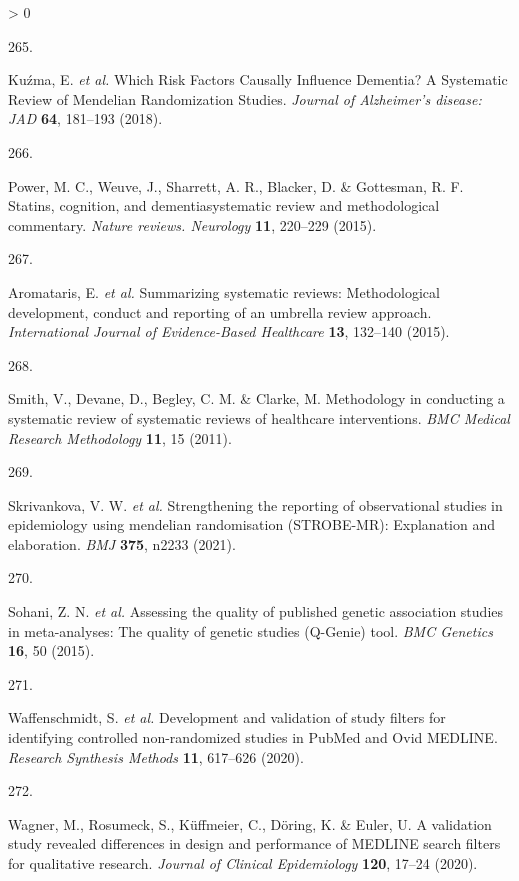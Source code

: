 \documentclass[a4paper, twoside]{templates/ociamthesis}
\newlength{\cslhangindent}
\newlength{\csllabelwidth}
\newenvironment{CSLReferences}[3] %
 {%
  \setlength{\parindent}{0pt}
  \ifodd #1 \everypar{\setlength{\hangindent}{\cslhangindent}}\ignorespaces\fi
  \ifnum #2 > 0
  \setlength{\parskip}{#2\baselineskip}
  \fi
 }%
 {}
\newcommand{\CSLLeftMargin}[1]{\parbox[t]{\maxof{\widthof{#1}}{\csllabelwidth}}{#1}}
\newcommand{\CSLRightInline}[1]{\parbox[t]{\linewidth - \csllabelwidth}{#1}}
\begin{document}
\begin{CSLReferences}{0}{0}
\leavevmode\hypertarget{ref-kuzma2018risk}{}%
\CSLLeftMargin{265. }
\CSLRightInline{Kuźma, E. \emph{et al.} Which {Risk Factors Causally Influence Dementia}? A {Systematic Review} of {Mendelian Randomization Studies}. \emph{Journal of Alzheimer's disease: JAD} \textbf{64}, 181--193 (2018).}

\leavevmode\hypertarget{ref-power2015}{}%
\CSLLeftMargin{266. }
\CSLRightInline{Power, M. C., Weuve, J., Sharrett, A. R., Blacker, D. \& Gottesman, R. F. Statins, cognition, and dementia{}systematic review and methodological commentary. \emph{Nature reviews. Neurology} \textbf{11}, 220--229 (2015).}

\leavevmode\hypertarget{ref-aromataris2015}{}%
\CSLLeftMargin{267. }
\CSLRightInline{Aromataris, E. \emph{et al.} Summarizing systematic reviews: Methodological development, conduct and reporting of an umbrella review approach. \emph{International Journal of Evidence-Based Healthcare} \textbf{13}, 132--140 (2015).}

\leavevmode\hypertarget{ref-smith2011}{}%
\CSLLeftMargin{268. }
\CSLRightInline{Smith, V., Devane, D., Begley, C. M. \& Clarke, M. Methodology in conducting a systematic review of systematic reviews of healthcare interventions. \emph{BMC Medical Research Methodology} \textbf{11}, 15 (2011).}

\leavevmode\hypertarget{ref-skrivankova2021}{}%
\CSLLeftMargin{269. }
\CSLRightInline{Skrivankova, V. W. \emph{et al.} Strengthening the reporting of observational studies in epidemiology using mendelian randomisation ({STROBE}-{MR}): Explanation and elaboration. \emph{BMJ} \textbf{375}, n2233 (2021).}

\leavevmode\hypertarget{ref-sohani2015}{}%
\CSLLeftMargin{270. }
\CSLRightInline{Sohani, Z. N. \emph{et al.} Assessing the quality of published genetic association studies in meta-analyses: The quality of genetic studies ({Q}-{Genie}) tool. \emph{BMC Genetics} \textbf{16}, 50 (2015).}

\leavevmode\hypertarget{ref-waffenschmidt2020}{}%
\CSLLeftMargin{271. }
\CSLRightInline{Waffenschmidt, S. \emph{et al.} Development and validation of study filters for identifying controlled non-randomized studies in {PubMed} and {Ovid MEDLINE}. \emph{Research Synthesis Methods} \textbf{11}, 617--626 (2020).}

\leavevmode\hypertarget{ref-wagner2020}{}%
\CSLLeftMargin{272. }
\CSLRightInline{Wagner, M., Rosumeck, S., Küffmeier, C., Döring, K. \& Euler, U. A validation study revealed differences in design and performance of {MEDLINE} search filters for qualitative research. \emph{Journal of Clinical Epidemiology} \textbf{120}, 17--24 (2020).}


\end{CSLReferences}
\end{document}
